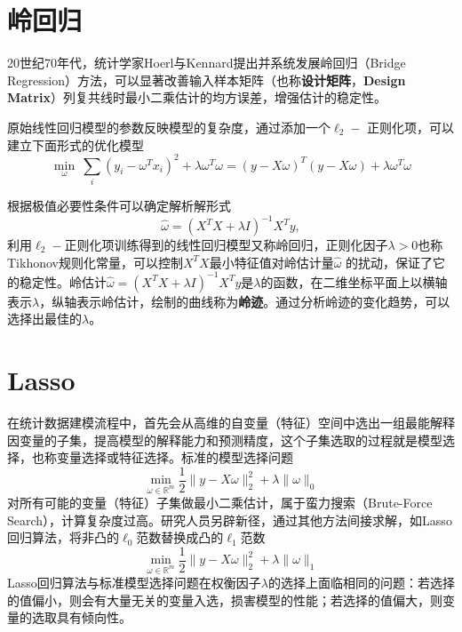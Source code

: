 \section{岭回归}
20世纪70年代，统计学家Hoerl与Kennard\cite{hoerl1970ridge}提出并系统发展岭回归（Bridge Regression）方法，可以显著改善输入样本矩阵（也称\textbf{设计矩阵}，\textbf{Design Matrix}）列复共线时最小二乘估计的均方误差，增强估计的稳定性。

原始线性回归模型的参数反映模型的复杂度，通过添加一个$\ell_2-$ 正则化项，可以建立下面形式的优化模型
\begin{equation}
    \min\limits_\omega~\sum\limits_i (y_i - \omega^T x_i)^2  + \lambda \omega^T \omega = (y-X\omega)^T (y-X\omega) + \lambda \omega^T \omega
\end{equation}

根据极值必要性条件可以确定解析解形式
\begin{equation}
    \hat \omega = (X^T X + \lambda I)^{-1} X^T y,
\end{equation}
利用$\ell_2-$正则化项训练得到的线性回归模型又称岭回归，正则化因子$\lambda>0$也称Tikhonov规则化常量，可以控制$X^T X$最小特征值对岭估计量$\hat \omega$ 的扰动，保证了它的稳定性。岭估计$\hat \omega = (X^T X + \lambda I)^{-1} X^T y$是$\lambda$的函数，在二维坐标平面上以横轴表示$\lambda$，纵轴表示岭估计，绘制的曲线称为\textbf{岭迹}。通过分析岭迹的变化趋势，可以选择出最佳的$\lambda$。

\section{Lasso}
在统计数据建模流程中，首先会从高维的自变量（特征）空间中选出一组最能解释因变量的子集，提高模型的解释能力和预测精度，这个子集选取的过程就是模型选择，也称变量选择或特征选择。标准的模型选择问题
\begin{equation}
    \min\limits_{\omega\in\mathbb{R}^m} \frac{1}{2}\|y-X\omega\|_2^2 + \lambda\|\omega\|_0
\end{equation}
对所有可能的变量（特征）子集做最小二乘估计，属于蛮力搜索（Brute-Force Search），计算复杂度过高。研究人员另辟新径，通过其他方法间接求解，如Lasso回归算法，将非凸的$\ell_0$范数替换成凸的$\ell_1$范数
\begin{equation}
    \min\limits_{\omega\in\mathbb{R}^m} \frac{1}{2}\|y-X\omega\|_2^2 + \lambda\|\omega\|_1
\end{equation}
Lasso回归算法与标准模型选择问题在权衡因子$\lambda$的选择上面临相同的问题：若选择的值偏小，则会有大量无关的变量入选，损害模型的性能；若选择的值偏大，则变量的选取具有倾向性。

